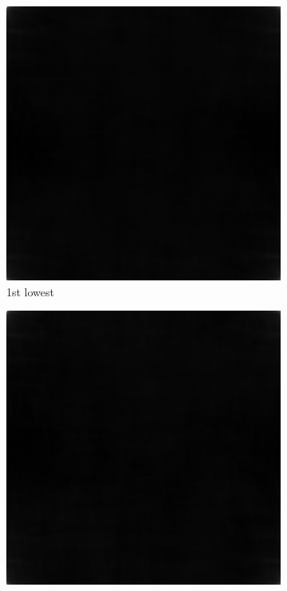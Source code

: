 \begin{figure}[h!]
\centering
\begin{subfigure}{0.2\textwidth}
  \centering
  \includegraphics[width=0.95\linewidth]{output/phase_low_1.jpg}
  \caption{1st lowest}
\end{subfigure}%
\begin{subfigure}{0.2\textwidth}
  \centering
  \includegraphics[width=0.95\linewidth]{output/phase_low_25.jpg}

\end{subfigure}
\end{figure}
